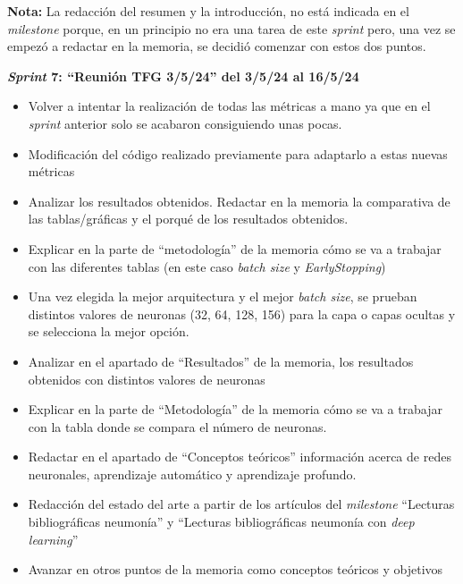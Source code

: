 \textbf{Nota:} La redacción del resumen y la introducción, no está indicada en el \textit{milestone}  porque, en un principio no era una tarea de este \textit{sprint} pero, una vez se empezó a redactar en la memoria, se decidió comenzar con estos dos puntos.

\textbf{\textit{Sprint} 7: ``Reunión TFG 3/5/24'' del 3/5/24 al 16/5/24}
\begin{itemize}
    \item Volver a intentar la realización de todas las métricas a mano ya que en el \textit{sprint} anterior solo se acabaron consiguiendo unas pocas.
    \item Modificación del código realizado previamente para adaptarlo a estas nuevas métricas
    \item Analizar los resultados obtenidos. Redactar en la memoria la comparativa de las tablas/gráficas y el porqué de los resultados obtenidos.
    \item Explicar en la parte de ``metodología'' de la memoria cómo se va a trabajar con las diferentes tablas (en este caso \textit{batch size} y \textit{EarlyStopping})
    \item Una vez elegida la mejor arquitectura y el mejor \textit{batch size}, se prueban distintos valores de neuronas (32, 64, 128, 156) para la capa o capas ocultas y se selecciona la mejor opción.
    \item Analizar en el apartado de ``Resultados'' de la memoria, los resultados obtenidos con distintos valores de neuronas
    \item Explicar en la parte de ``Metodología'' de la memoria cómo se va a trabajar con la tabla donde se compara el número de neuronas.
    \item Redactar en el apartado de ``Conceptos teóricos'' información acerca de redes neuronales, aprendizaje automático y aprendizaje profundo.
    \item Redacción del estado del arte a partir de los artículos del \textit{milestone} ``Lecturas bibliográficas neumonía'' y ``Lecturas bibliográficas neumonía con \textit{deep learning}''
    \item Avanzar en otros puntos de la memoria como conceptos teóricos y objetivos
\end{itemize}

